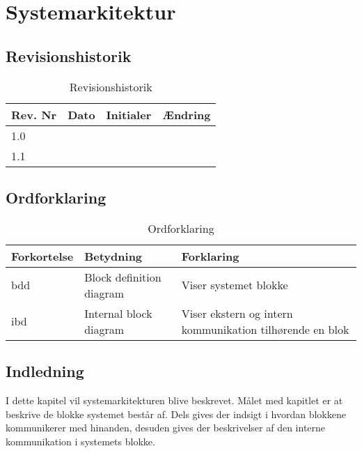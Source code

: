 \chapter{Systemarkitektur}

\section{Revisionshistorik}
\begin{table}[H]
	\centering
		\begin{tabular}{|p{2 cm}|p{2 cm}|p{3 cm}|p{6 cm}|} 
		\hline
			\textbf{Rev. Nr} & \textbf{Dato}		& \textbf{Initialer} 	& \textbf{Ændring} \\ \hline
			1.0 	& & &  \\ \hline
			1.1 	& & &	\\ \hline
		\end{tabular}
	\caption{Revisionshistorik}
\end{table}

\vspace{1.5cm}

\section{Ordforklaring}
\begin{table}[H]
	\centering
		\begin{tabular}{|p{2.5cm}|p{4.5 cm}|p{6.5 cm}|} 
		\hline
			\textbf{Forkortelse} & \textbf{Betydning} & \textbf{Forklaring} \\ \hline
			 bdd& Block definition diagram  & Viser systemet blokke  \\ \hline
			 ibd& Internal block diagram & Viser ekstern og intern kommunikation tilhørende en blok \\ \hline
		\end{tabular}
	\caption{Ordforklaring}
\end{table}

\vspace{2cm}

\section{Indledning}
I dette kapitel vil systemarkitekturen blive beskrevet. Målet med kapitlet er at beskrive de blokke systemet består af. Dels gives der indsigt i hvordan blokkene kommunikerer med hinanden, desuden gives der beskrivelser af den interne kommunikation i systemets blokke. 
